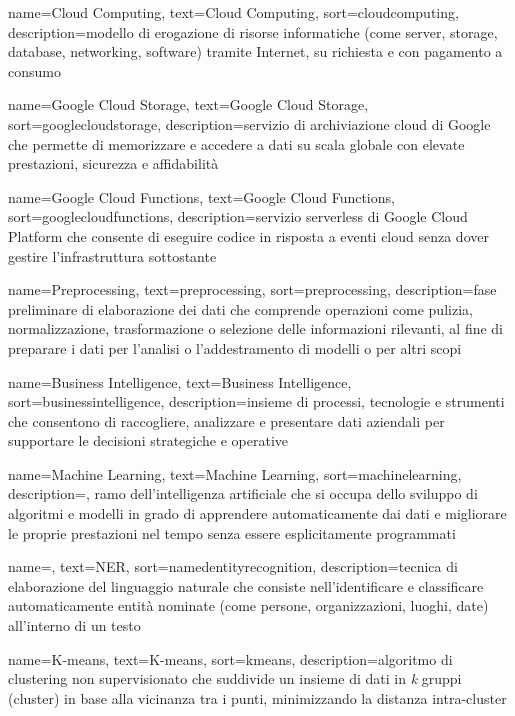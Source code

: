  {
    name=Cloud Computing,
    text=Cloud Computing,
    sort=cloudcomputing,
    description={modello di erogazione di risorse informatiche (come server, storage, database, networking, software) tramite Internet, su richiesta e con pagamento a consumo}
}

 {
    name=Google Cloud Storage,
    text=Google Cloud Storage,
    sort=googlecloudstorage,
    description={servizio di archiviazione cloud di Google che permette di memorizzare e accedere a dati su scala globale con elevate prestazioni, sicurezza e affidabilità}
}

 {
    name=Google Cloud Functions,
    text=Google Cloud Functions,
    sort=googlecloudfunctions,
    description={servizio serverless di Google Cloud Platform che consente di eseguire codice in risposta a eventi cloud senza dover gestire l'infrastruttura sottostante}
}

 {
    name=Preprocessing,
    text=preprocessing,
    sort=preprocessing,
    description={fase preliminare di elaborazione dei dati che comprende operazioni come pulizia, normalizzazione, trasformazione o selezione delle informazioni rilevanti, al fine di preparare i dati per l'analisi o l'addestramento di modelli o per altri scopi}
}

 {
    name=Business Intelligence,
    text=Business Intelligence,
    sort=businessintelligence,
    description={insieme di processi, tecnologie e strumenti che consentono di raccogliere, analizzare e presentare dati aziendali per supportare le decisioni strategiche e operative}
}

 {
    name=Machine Learning,
    text=Machine Learning,
    sort=machinelearning,
    description={, ramo dell'intelligenza artificiale che si occupa dello sviluppo di algoritmi e modelli in grado di apprendere automaticamente dai dati e migliorare le proprie prestazioni nel tempo senza essere esplicitamente programmati}
}

 {
    name=,
    text=NER,
    sort=namedentityrecognition,
    description={tecnica di elaborazione del linguaggio naturale che consiste nell'identificare e classificare automaticamente entità nominate (come persone, organizzazioni, luoghi, date) all'interno di un testo}
}

 {
    name=K-means,
    text=K-means,
    sort=kmeans,
    description={algoritmo di clustering non supervisionato che suddivide un insieme di dati in \emph{k} gruppi (cluster) in base alla vicinanza tra i punti, minimizzando la distanza intra-cluster}
}


